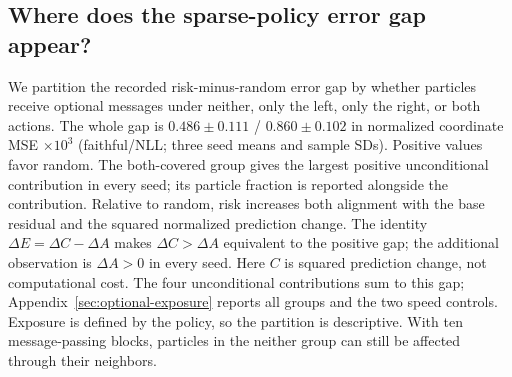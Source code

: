 \subsection{Where does the sparse-policy error gap appear?}
We partition the recorded risk-minus-random error gap by whether particles
receive optional messages under neither, only the left, only the right, or
both actions. The whole gap is $0.486\pm0.111$ / $0.860\pm0.102$
in normalized coordinate MSE $\times10^3$ (faithful/NLL; three seed means
and sample SDs). Positive values favor random.
The both-covered group gives the largest positive unconditional contribution
in every seed; its particle fraction is reported alongside the contribution.
Relative to random, risk increases both alignment with the base residual
and the squared normalized prediction change. The identity
$\Delta E=\Delta C-\Delta A$ makes $\Delta C>\Delta A$ equivalent to the
positive gap; the additional observation is $\Delta A>0$ in every seed.
Here $C$ is squared prediction change, not computational cost.
The four unconditional contributions sum to this gap; Appendix~\ref{sec:optional-exposure} reports
all groups and the two speed controls. Exposure is defined by the policy,
so the partition is descriptive. With ten message-passing blocks, particles
in the neither group can still be affected through their neighbors.
